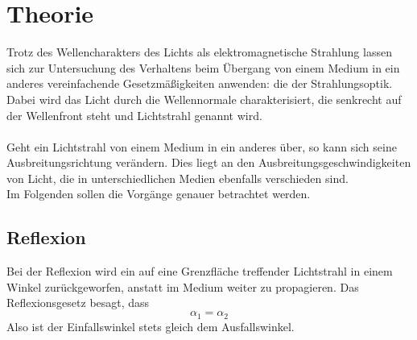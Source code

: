 \section{Theorie}
\label{sec:Theorie}
Trotz des Wellencharakters des Lichts als elektromagnetische Strahlung
lassen sich zur Untersuchung des Verhaltens beim Übergang von einem Medium
in ein anderes vereinfachende Gesetzmäßigkeiten anwenden: die der Strahlungsoptik.\\
Dabei wird das Licht durch die Wellennormale charakterisiert, die senkrecht auf der
Wellenfront steht und Lichtstrahl genannt wird.\\
\\
Geht ein Lichtstrahl von einem Medium in ein anderes über, so kann sich seine
Ausbreitungsrichtung verändern. Dies liegt an den Ausbreitungsgeschwindigkeiten
von Licht, die in unterschiedlichen Medien ebenfalls verschieden sind.\\
Im Folgenden sollen die Vorgänge genauer betrachtet werden.

\subsection{Reflexion}
Bei der Reflexion wird ein auf eine Grenzfläche treffender Lichtstrahl
in einem Winkel zurückgeworfen, anstatt im Medium weiter zu propagieren.
Das Reflexionsgesetz besagt, dass
\begin{equation}
    \alpha_1 = \alpha_2
    \label{eqn:reflexion}
\end{equation}
Also ist der Einfallswinkel stets gleich dem Ausfallswinkel.

